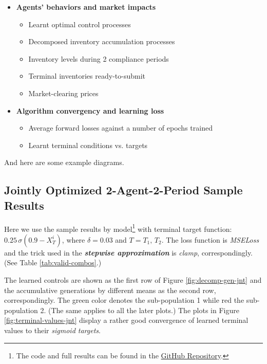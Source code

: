 \documentclass[a4paper,10pt]{article}
\newcommand{\1}{\mathbf{1}}
\begin{document}
\vspace{-0.5\topsep}

\begin{itemize}
  \setlength{\parskip}{0pt}
  \item\textbf{Agents' behaviors and market impacts}
    \begin{itemize}
      \item Learnt optimal control processes
      \item Decomposed inventory accumulation processes
      \item Inventory levels during 2 compliance periods
      \item Terminal inventories ready-to-submit
      \item Market-clearing prices
    \end{itemize}
  \item\textbf{Algorithm convergency and learning loss}
      \begin{itemize}
        \item Average forward losses against a number of epochs trained
        \item Learnt terminal conditions vs. targets
      \end{itemize}
\end{itemize}

And here are some example diagrams.

\subsection{Jointly Optimized 2-Agent-2-Period Sample Results}

Here we use the sample results by model\footnote{The code and full results can be found in the \href{https://github.com/OrangeAoo/PA-MFG-FBSDE/blob/FBSDE/2Period/Joint_Optim_2Prdx1/Adamax_clamp_sig_MSE.ipynb}{GitHub Repository}.} with terminal target function: $0.25\,\sigma{\left(0.9-X_T^i\right)}$, where $\delta=0.03$ and $T=T_1,\,T_2$. The loss function is \textit{MSELoss} and the trick used in the \textbf{\textit{stepwise approximation}} is \textit{clamp}, correspondingly. (See Table \ref{tab:valid-combos}.)

The learned controls are shown as the first row of Figure \ref{fig:decomp-gen-jnt} and the accumulative generations by different means as the second row, correspondingly. The green color denotes the sub-population 1 while red the sub-population 2. (The same applies to all the later plots.) 
The plots in Figure \ref{fig:terminal-values-jnt} display a rather good convergence of learned terminal values to their \textit{sigmoid targets}. 
\end{document}
